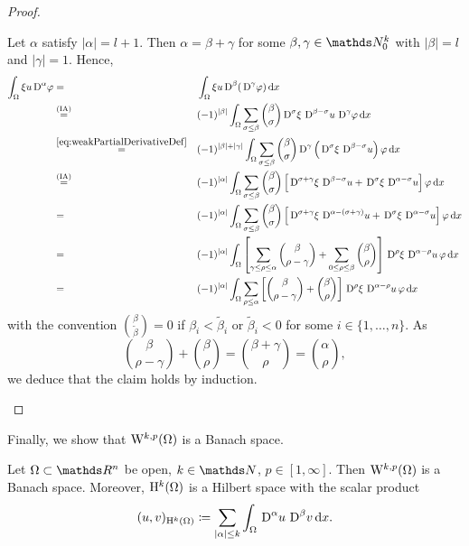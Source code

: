 \begin{proof}
\begin{enumerate}
      Let $\alpha$ satisfy $|\alpha| = l+1$.
      Then $\alpha  = \beta + \gamma$ for some $\beta, \gamma \in \N_0^k$ with $|\beta| = l$ and $|\gamma| = 1$.
      Hence,
      \begin{alignat*}{2}
        \int_\Omega \xi u \,{\operatorname{D}}^\alpha \varphi
        &= &&\int_\Omega \xi u\,{\operatorname{D}}^\beta (\,{\operatorname{D}}^\gamma \varphi ) \, {\operatorname{d}\!{x}} \\
        &\overset{\mathrm{(IA)}}{=} &&(-1)^{|\beta|} \int_\Omega \sum_{\sigma \leq \beta} \binom{\beta}{\sigma} \,{\operatorname{D}}^\sigma \xi\, \,{\operatorname{D}}^{\beta - \sigma} u\, \,{\operatorname{D}}^\gamma \varphi \, {\operatorname{d}\!{x}} \\
        &\overset{\eqref{eq:weakPartialDerivativeDef}}{=} &&(-1)^{|\beta|+|\gamma|} \int_\Omega \sum_{\sigma \leq \beta} \binom{\beta}{\sigma} \,{\operatorname{D}}^\gamma \left( \,{\operatorname{D}}^\sigma \xi \, \,{\operatorname{D}}^{\beta - \sigma} u \right) \varphi \, {\operatorname{d}\!{x}} \\
        &\overset{\mathrm{(IA)}}{=} &&(-1)^{|\alpha|} \int_\Omega \sum_{\sigma \leq \beta} \binom{\beta}{\sigma} \left[ \,{\operatorname{D}}^{\sigma + \gamma} \xi\, \,{\operatorname{D}}^{\beta - \sigma} u + \,{\operatorname{D}}^\sigma \xi \,\,{\operatorname{D}}^{\alpha - \sigma} u \right] \varphi \, {\operatorname{d}\!{x}}\\
        &= &&(-1)^{|\alpha|} \int_\Omega \sum_{\sigma \leq \beta} \binom{\beta}{\sigma} \left[ \,{\operatorname{D}}^{\sigma + \gamma} \xi\, \,{\operatorname{D}}^{\alpha - (\sigma + \gamma)} u + \,{\operatorname{D}}^\sigma \xi \,\,{\operatorname{D}}^{\alpha - \sigma} u \right] \varphi \, {\operatorname{d}\!{x}}\\
        &= &&(-1)^{|\alpha|} \int_\Omega \left [\sum_{\gamma \leq \rho \leq \alpha} \binom{\beta}{\rho - \gamma} + \sum_{0 \leq \rho \leq \beta} \binom{\beta}{\rho} \right] \,{\operatorname{D}}^\rho \xi \,\,{\operatorname{D}}^{\alpha - \rho}u \, \varphi \, {\operatorname{d}\!{x}} \\
        &= &&(-1)^{|\alpha|} \int_\Omega \sum_{\rho \leq \alpha} \left[ \binom{\beta}{\rho - \gamma} + \binom{\beta }{\rho}\right] \,{\operatorname{D}}^\rho \xi \, \,{\operatorname{D}}^{\alpha - \rho} u \, \varphi \, {\operatorname{d}\!{x}}
      \end{alignat*}
      with the convention $\binom{\beta}{\tilde\beta} = 0$ if $\beta_i < \tilde \beta_i$ or $\tilde \beta_i < 0$ for some $i \in \{1,\dots,n\}$.
      As $$\binom{\beta}{\rho - \gamma} + \binom{\beta}{\rho} = \binom{\beta + \gamma}{\rho} = \binom{\alpha}{\rho},$$ we deduce that the claim holds by induction.\qedhere
  \end{enumerate}
\end{proof}

Finally, we show that $\mathrm{W}^{k,p}(\Omega)$ is a Banach space.

\begin{thm}
  Let $\Omega \subset \R^n$ be open, $k \in \N$, $p \in [1,\infty]$.
  Then $\mathrm{W}^{k,p}(\Omega)$ is a Banach space.
  Moreover, $\mathrm{H}^k(\Omega)$ is a Hilbert space with the scalar product
  $$
  (u,v)_{\mathrm{H}^k(\Omega)} \coloneqq \sum_{|\alpha| \leq k} \int_\Omega \,{\operatorname{D}}^\alpha u \, {\,{\operatorname{D}}^\beta v} \, {\operatorname{d}\!{x}}.
  $$
\end{thm}

